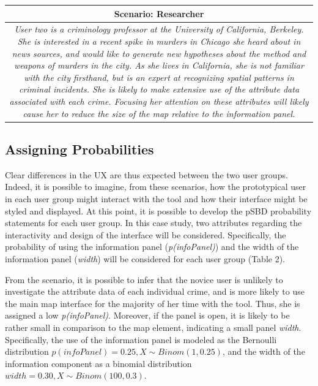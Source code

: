 \documentclass[]{article}
\begin{document}
\begin{longtable}[]{@{}c@{}}
\toprule
\begin{minipage}[b]{0.97\columnwidth}\centering\strut
Scenario: Researcher\strut
\end{minipage}\tabularnewline
\midrule
\endhead
\begin{minipage}[t]{0.97\columnwidth}\centering\strut
\emph{User two is a criminology professor at the University of
California, Berkeley. She is interested in a recent spike in murders in
Chicago she heard about in news sources, and would like to generate new
hypotheses about the method and weapons of murders in the city. As she
lives in California, she is not familiar with the city firsthand, but is
an expert at recognizing spatial patterns in criminal incidents. She is
likely to make extensive use of the attribute data associated with each
crime. Focusing her attention on these attributes will likely cause her
to reduce the size of the map relative to the information panel.}\strut
\end{minipage}\tabularnewline
\bottomrule
\end{longtable}

\subsection{Assigning Probabilities}\label{assigning-probabilities}

Clear differences in the UX are thus expected between the two user
groups. Indeed, it is possible to imagine, from these scenarios, how the
prototypical user in each user group might interact with the tool and
how their interface might be styled and displayed. At this point, it is
possible to develop the pSBD probability statements for each user group.
In this case study, two attributes regarding the interactivity and
design of the interface will be considered. Specifically, the
probability of using the information panel (\emph{p(infoPanel)}) and the
width of the information panel (\emph{width}) will be considered for
each user group (Table 2).

From the scenario, it is possible to infer that the novice user is
unlikely to investigate the attribute data of each individual crime, and
is more likely to use the main map interface for the majority of her
time with the tool. Thus, she is assigned a low \emph{p(infoPanel)}.
Moreover, if the panel is open, it is likely to be rather small in
comparison to the map element, indicating a small panel \emph{width}.
Specifically, the use of the information panel is modeled as the
Bernoulli distribution \(p(infoPanel)=0.25, X \sim Binom(1, 0.25)\), and
the width of the information component as a binomial distribution
\(width = 0.30, X \sim Binom(100, 0.3)\).
\end{document}
